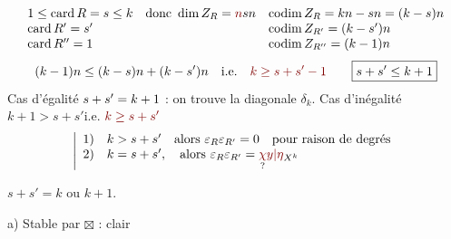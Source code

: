 \[
\begin{array}{lll}
1\le\operatorname{card}R=s\le k&
\text{donc }\dim Z_R=\deleted{\unsure{n}}sn&
\operatorname{codim}Z_R=kn-sn=(k-s)n\\
\operatorname{card}R'=s'&&\operatorname{codim}Z_{R'}=(k-s')n\\
\operatorname{card}R''=1&&\operatorname{codim}Z_{R''}=(k-1)n
\end{array}
\]
\[
(k-1)n\le(k-s)n+(k-s')n
\quad\text{i.e.}\quad\deleted{\unsure{k\ge s+s'-1}}
\qquad\boxed{s+s'\le k+1}
\]
Cas d'égalité $s+s'=k+1$ : on trouve la diagonale $\delta_k$.
Cas d'inégalité\quad
$k+1>s+s'$\quad i.e. $\unsure{k\ge s+s'}$
\[
\left|\begin{array}{ll}
1)&k>s+s'\quad\text{alors }\varepsilon_R\varepsilon_{R'}=0
\quad\text{pour raison de degrés}\\
2)&k=s+s',\quad\text{alors }\varepsilon_R\varepsilon_{R'}
=\underset{?}{\unsure{\chi}}\unsure{y|\eta}_{X^k}
\end{array}\right.
\]

$s+s'=k\text{ ou }k+1$.




a) Stable par $\boxtimes$ : clair

